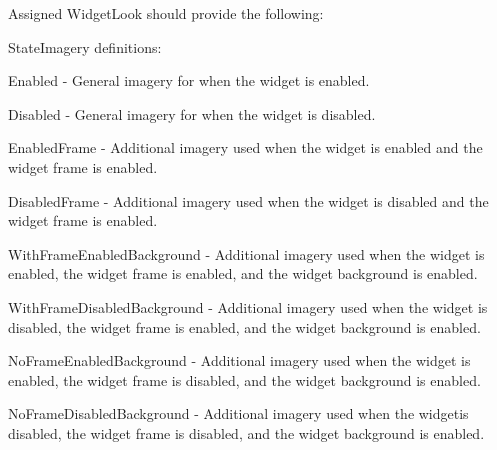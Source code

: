 Assigned Widget\+Look should provide the following\+: 
\begin{DoxyItemize}
\item State\+Imagery definitions\+: 
\begin{DoxyItemize}
\item Enabled -\/ General imagery for when the widget is enabled. 
\item Disabled -\/ General imagery for when the widget is disabled. 
\item Enabled\+Frame -\/ Additional imagery used when the widget is enabled and the widget frame is enabled. 
\item Disabled\+Frame -\/ Additional imagery used when the widget is disabled and the widget frame is enabled. 
\item With\+Frame\+Enabled\+Background -\/ Additional imagery used when the widget is enabled, the widget frame is enabled, and the widget background is enabled. 
\item With\+Frame\+Disabled\+Background -\/ Additional imagery used when the widget is disabled, the widget frame is enabled, and the widget background is enabled. 
\item No\+Frame\+Enabled\+Background -\/ Additional imagery used when the widget is enabled, the widget frame is disabled, and the widget background is enabled. 
\item No\+Frame\+Disabled\+Background -\/ Additional imagery used when the widgetis disabled, the widget frame is disabled, and the widget background is enabled. 
\end{DoxyItemize}



\end{DoxyItemize}
